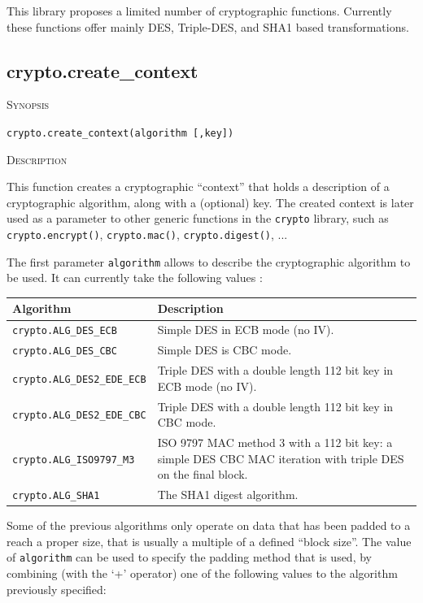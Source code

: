 \documentclass[11pt]{report}
\newcommand{\mansection}[1]{\vspace{0.5em}\par\noindent\textsc{#1}\vspace{0.5em}\par}
\newcommand{\syn}[1]{\texttt{#1}}
\begin{document}
This library proposes a limited number of cryptographic functions.
Currently these functions offer mainly DES, Triple-DES, and SHA1 based transformations.

\subsection{crypto.create\_context}

\mansection{Synopsis}
\syn{crypto.create\_context(algorithm [,key])}

\mansection{Description}
  This function creates a cryptographic ``context'' that holds a description of a 
  cryptographic algorithm, along with a (optional) key.
  The created context is later used as a parameter to other generic functions in the \syn{crypto}
  library, such as \syn{crypto.encrypt()}, \syn{crypto.mac()}, \syn{crypto.digest()}, ...

  The first parameter \syn{algorithm} allows to describe the cryptographic algorithm to be used.
  It can currently take the following values :

  \vspace{2em}
  \begin{tabular}{|l|p{8cm}|}
  \hline
  \textbf{Algorithm}                & \textbf{Description} \\
  \hline
  \hline
  \syn{crypto.ALG\_DES\_ECB}        & Simple DES in ECB mode (no IV). \\
  \hline
  \syn{crypto.ALG\_DES\_CBC}        & Simple DES is CBC mode. \\
  \hline
  \syn{crypto.ALG\_DES2\_EDE\_ECB}  & Triple DES with a double length 112 bit key in ECB mode (no IV). \\
  \hline
  \syn{crypto.ALG\_DES2\_EDE\_CBC}  & Triple DES with a double length 112 bit key in CBC mode.  \\
  \hline
  \syn{crypto.ALG\_ISO9797\_M3}     & ISO 9797 MAC method 3 with a 112 bit key: 
                                      a simple DES CBC MAC iteration with triple DES on the final block.\\
  \hline
  \syn{crypto.ALG\_SHA1}            & The SHA1 digest algorithm. \\
  \hline
  \end{tabular}
  \vspace{2em}

  Some of the previous algorithms only operate on data that has been padded
  to a reach a proper size, that is usually a multiple of a defined ``block size''.
  The value of \syn{algorithm} can be used to specify the padding method that is used, 
  by combining (with the `+' operator) one of the following values to the algorithm 
  previously specified:
\end{document}
